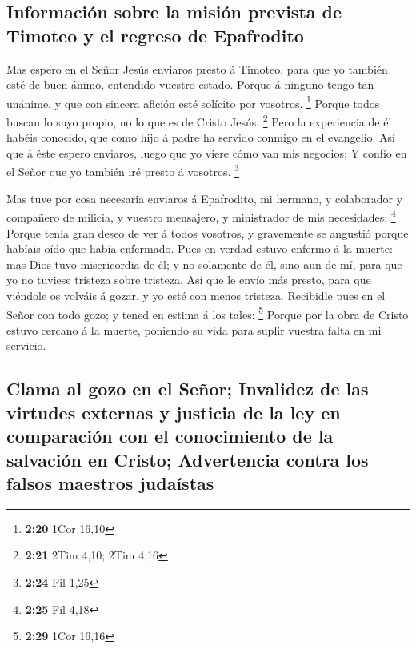 \hypertarget{informaciuxf3n-sobre-la-misiuxf3n-prevista-de-timoteo-y-el-regreso-de-epafrodito}{%
\subsection{Información sobre la misión prevista de Timoteo y el regreso
de
Epafrodito}\label{informaciuxf3n-sobre-la-misiuxf3n-prevista-de-timoteo-y-el-regreso-de-epafrodito}}

 Mas espero en el Señor Jesús enviaros presto á Timoteo,
para que yo también esté de buen ánimo, entendido vuestro estado.
 Porque á ninguno tengo tan unánime, y que con sincera
afición esté solícito por vosotros. \footnote{\textbf{2:20} 1Cor 16,10}
 Porque todos buscan lo suyo propio, no lo que es de Cristo
Jesús. \footnote{\textbf{2:21} 2Tim 4,10; 2Tim 4,16}  Pero
la experiencia de él habéis conocido, que como hijo á padre ha servido
conmigo en el evangelio.  Así que á éste espero enviaros,
luego que yo viere cómo van mis negocios;  Y confío en el
Señor que yo también iré presto á vosotros. \footnote{\textbf{2:24} Fil
  1,25}

 Mas tuve por cosa necesaria enviaros á Epafrodito, mi
hermano, y colaborador y compañero de milicia, y vuestro mensajero, y
ministrador de mis necesidades; \footnote{\textbf{2:25} Fil 4,18}
 Porque tenía gran deseo de ver á todos vosotros, y
gravemente se angustió porque habíais oído que había enfermado.
 Pues en verdad estuvo enfermo á la muerte: mas Dios tuvo
misericordia de él; y no solamente de él, sino aun de mí, para que yo no
tuviese tristeza sobre tristeza.  Así que le envío más
presto, para que viéndole os volváis á gozar, y yo esté con menos
tristeza.  Recibidle pues en el Señor con todo gozo; y
tened en estima á los tales: \footnote{\textbf{2:29} 1Cor 16,16}
 Porque por la obra de Cristo estuvo cercano á la muerte,
poniendo su vida para suplir vuestra falta en mi servicio.

\hypertarget{clama-al-gozo-en-el-seuxf1or-invalidez-de-las-virtudes-externas-y-justicia-de-la-ley-en-comparaciuxf3n-con-el-conocimiento-de-la-salvaciuxf3n-en-cristo-advertencia-contra-los-falsos-maestros-judauxedstas}{%
\subsection{Clama al gozo en el Señor; Invalidez de las virtudes
externas y justicia de la ley en comparación con el conocimiento de la
salvación en Cristo; Advertencia contra los falsos maestros
judaístas}\label{clama-al-gozo-en-el-seuxf1or-invalidez-de-las-virtudes-externas-y-justicia-de-la-ley-en-comparaciuxf3n-con-el-conocimiento-de-la-salvaciuxf3n-en-cristo-advertencia-contra-los-falsos-maestros-judauxedstas}}

